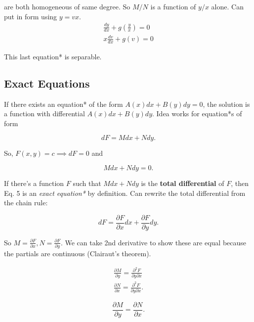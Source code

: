are both homogeneous of same degree. So $M/N$ is a function of $y/x$ alone.
Can put in form using $y=vx$.
\begin{eqnarray}
    \frac{dy}{dx}+g(\frac{y}{x})=0\\
    x\frac{dv}{dx}+g(v)=0
\end{eqnarray}

This last equation* is separable.

\subsection{Exact Equations}

If there exists an equation* of the form $A(x)dx+B(y)dy=0$, the solution is a function with differential $A(x)dx+B(y)dy$.
Idea works for equation*s of form

\begin{equation*}
    dF=Mdx+Ndy.
\end{equation*}

So, $F(x,y)=c\implies dF=0$ and

\begin{equation*}
    Mdx+Ndy=0.
\end{equation*}

If there's a function $F$ such that $Mdx+Ndy$ is the \textbf{total differential}
of $F$, then Eq. 5 is an \textit{exact equation*} by definition. Can rewrite the total differential from the chain rule:

\begin{equation*}
    dF=\frac{\partial F}{\partial x}dx+\frac{\partial F}{\partial y}dy.
\end{equation*}

So $M=\frac{\partial F}{\partial x},N=\frac{\partial F}{\partial y}$. We can take 2nd derivative to show these are equal because the partials are continuous (Clairaut's theorem).

\begin{eqnarray}
    \frac{\partial M}{\partial y}=\frac{\partial^2 F}{\partial y\partial x}\\
    \frac{\partial N}{\partial x}=\frac{\partial^2 F}{\partial y\partial x}.
\end{eqnarray}

\begin{definition}[Exactness]
    \begin{equation*}
        \frac{\partial M}{\partial y}=\frac{\partial N}{\partial x}.
    \end{equation*}
\end{definition}

